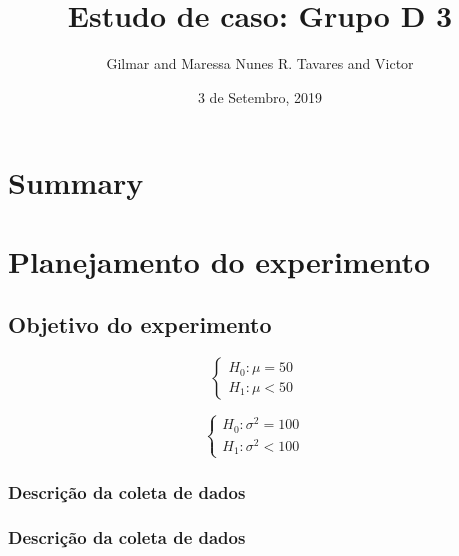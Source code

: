 \documentclass[]{article}
\title{Estudo de caso: Grupo D 3}
\author{Gilmar and Maressa Nunes R. Tavares and Victor}
\date{3 de Setembro, 2019}
\begin{document}
\maketitle

\hypertarget{summary}{%
\section{Summary}\label{summary}}

\hypertarget{planejamento-do-experimento}{%
\section{Planejamento do
experimento}\label{planejamento-do-experimento}}

\hypertarget{objetivo-do-experimento}{%
\subsection{Objetivo do experimento}\label{objetivo-do-experimento}}

\[\begin{cases} H_0: \mu = 50&\\H_1: \mu<50\end{cases}\]

\[\begin{cases} H_0: \sigma^{2} = 100&\\H_1: \sigma^{2} < 100\end{cases}\]

\hypertarget{descricao-da-coleta-de-dados}{%
\subsubsection{Descrição da coleta de
dados}\label{descricao-da-coleta-de-dados}}

\hypertarget{descricao-da-coleta-de-dados-1}{%
\subsubsection{Descrição da coleta de
dados}\label{descricao-da-coleta-de-dados-1}}
\end{document}
